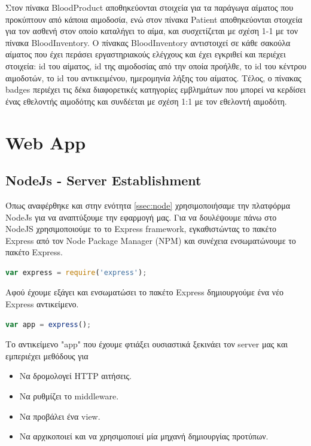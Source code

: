 		Στον πίνακα BloodProduct αποθηκεύονται στοιχεία για τα παράγωγα αίματος που προκύπτουν από κάποια αιμοδοσία, ενώ στον πίνακα Patient αποθηκεύονται στοιχεία για τον ασθενή στον οποίο καταλήγει το αίμα, και συσχετίζεται με σχέση 1-1 με τον πίνακα BloodInventory. Ο πίνακας BloodInventory αντιστοιχεί σε κάθε σακούλα αίματος που έχει περάσει εργαστηριακούς ελέγχους και έχει εγκριθεί και περιέχει στοιχεία: id του αίματος, id της αιμοδοσίας από την οποία προήλθε, το id του κέντρου αιμοδοτών, το id του αντικειμένου, ημερομηνία λήξης του αίματος. Τέλος, ο πίνακας badges περιέχει τις δέκα διαφορετικές κατηγορίες εμβλημάτων που μπορεί να κερδίσει ένας εθελοντής αιμοδότης και συνδέεται με σχέση 1:1 με τον εθελοντή αιμοδότη.

\section{Web App}
	\subsection{NodeJs - Server Establishment}
	
	Όπως αναφέρθηκε και στην ενότητα \ref{ssec:node} χρησιμοποιήσαμε την πλατφόρμα NodeJs για να αναπτύξουμε την εφαρμογή μας. Για να δουλέψουμε πάνω στο NodeJS χρησιμοποιούμε το το Express framework, εγκαθιστώντας το πακέτο Express από τον Node Package Manager (NPM) και συνέχεια ενσωματώνουμε το πακέτο Express. 
	
		\begin{lstlisting}[language=Javascript]	
	  		var express = require('express');
		\end{lstlisting}
		
		
	Αφού έχουμε εξάγει και ενσωματώσει το πακέτο Express δημιουργούμε ένα νέο Express αντικείμενο.	
		
		
		\begin{lstlisting}[language=Javascript]	
			var app = express(); 	
 		\end{lstlisting}
		
			Το αντικείμενο "app" που έχουμε φτιάξει ουσιαστικά ξεκινάει τον server μας και εμπεριέχει μεθόδους για 
			\begin{itemize}
			\item Να δρομολογεί HTTP αιτήσεις.
			\item Να ρυθμίζει το middleware.
			\item Να προβάλει ένα view.
			\item Να αρχικοποιεί και να χρησιμοποιεί μία μηχανή δημιουργίας προτύπων.
			\end{itemize}
				

